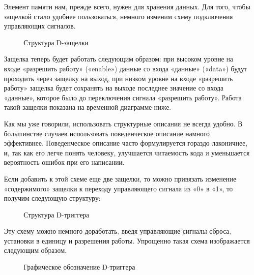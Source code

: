 \documentclass[a5paper, DIV=14, headings=openany, twoside=true,fontsize=10pt, titlepage]{scrreprt}
\newcommand{\quotes}[1]{«#1»}
\newcommand{\eng}[1]{\foreignlanguage{english}{#1}}
\newcommand{\qeng}[1]{\quotes{\eng{#1}}}
\begin{document}
\par{Элемент памяти нам, прежде всего, нужен для хранения данных. Для того, чтобы защелкой стало удобнее пользоваться, немного изменим схему подключения управляющих сигналов.}

\begin{figure}[H]
	\centering
	\def\svgwidth{\columnwidth}
	
	\caption{Структура \eng{D}-защелки}
\end{figure}
		
\par{Защелка теперь будет работать следующим образом: при высоком уровне на входе \quotes{разрешить работу} (\qeng{enable}) данные со входа \quotes{данные} (\qeng{data}) будут проходить через защелку на выход, при низком уровне на входе \quotes{разрешить работу} защелка будет сохранять на выходе последнее значение со входа \quotes{данные}, которое было до переключения сигнала \quotes{разрешить работу}. Работа такой защелки показана на временной диаграмме ниже.}
		
\par{Как мы уже говорили, использовать структурные описания не всегда удобно. В большинстве случаев использовать поведенческое описание намного эффективнее. Поведенческое описание часто формулируется гораздо лаконичнее, и, так как его легче понять человеку, улучшается читаемость кода и уменьшается вероятность ошибок при его написании.}


		
\par{Если добавить к этой схеме еще две защелки, то можно привязать изменение \quotes{содержимого} защелки к переходу управляющего сигнала из \quotes{0} в \quotes{1}, то получим следующую структуру:}

\begin{figure}[H]
	\centering
	\def\svgwidth{\columnwidth}
	
	\caption{Структура \eng{D}-триггера}
\end{figure}
		
\par{Эту схему можно немного доработать, введя управляющие сигналы сброса, установки в единицу и разрешения работы. Упрощенно такая схема изображается следующим образом.}

\begin{figure}[H]
	\centering
	\def\svgwidth{\columnwidth}
	
	\caption{Графическое обозначение \eng{D}-триггера}
\end{figure}
		
\end{document}
